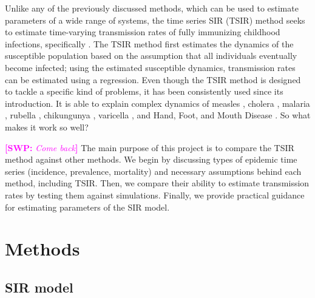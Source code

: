 \documentclass{article}
\newcommand{\comment}[3]{\textcolor{#1}{\textbf{[#2: }\textsl{#3}\textbf{]}}}
\newcommand{\swp}[1]{\comment{magenta}{SWP}{#1}}
\begin{document}
Unlike any of the previously discussed methods, which can be used to estimate parameters of a wide range of systems, the time series SIR (TSIR) method seeks to estimate time-varying transmission rates of fully immunizing childhood infections, specifically \citep{finkenstadt2000time}.
The TSIR method first estimates the dynamics of the susceptible population based on the assumption that all individuals eventually become infected;
using the estimated susceptible dynamics, transmission rates can be estimated using a regression. 
Even though the TSIR method is designed to tackle a specific kind of problems, it has been consistently used since its introduction.
It is able to explain complex dynamics of measles \citep{finkenstadt2000time, bjornstad2002dynamics, grenfell2002dynamics, finkenstadt2002stochastic, metcalf2009seasonality, mantilla2009decreasing, ferrari2010rural, dalziel2016persistent, mahmud2017drivers}, 
cholera \citep{koelle2004disentangling, pascual2008predicting}, 
malaria \citep{pascual2007shifting}, 
rubella \citep{metcalf2010rubella,metcalf2011epidemiology, metcalf2013implications}, 
chikungunya \citep{perkins2015estimating}, 
varicella \citep{jackson2014effects, baker2018dynamic}, 
and Hand, Foot, and Mouth Disease \citep{takahashi2016hand, van2016hand, du2017estimating, takahashi2018epidemic}.
So what makes it work so well?

\swp{Come back}
The main purpose of this project is to compare the TSIR method against other methods.
We begin by discussing types of epidemic time series (incidence, prevalence, mortality) and necessary assumptions behind each method, including TSIR.
Then, we compare their ability to estimate transmission rates by testing them against simulations.
Finally, we provide practical guidance for estimating parameters of the SIR model.

\section{Methods}

\subsection{SIR model}
\end{document}
